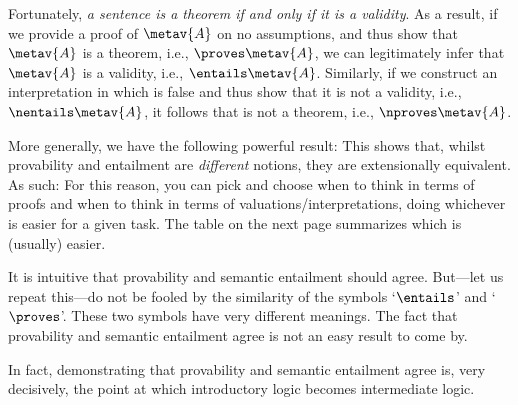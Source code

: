Fortunately, \emph{a sentence is a theorem if and only if it is a validity}. As a result, if we provide a proof of $\metav{A}$ on no assumptions, and thus show that $\metav{A}$ is a theorem, i.e., ${}\proves \metav{A}$, we can legitimately infer that $\metav{A}$ is a validity, i.e., $\entails\metav{A}$. Similarly, if we construct an interpretation in which  is false and thus show that it is not a validity, i.e., $\nentails \metav{A}$, it follows that  is not a theorem, i.e.,  $\nproves \metav{A}$.

More generally, we have the following powerful result:
This shows that, whilst provability and entailment are \emph{different} notions, they are extensionally equivalent. As such:
For this reason, you can pick and choose when to think in terms of proofs and when to think in terms of valuations/interpretations, doing whichever is easier for a given task. The table on the next page summarizes which is (usually) easier.

It is intuitive that provability and semantic entailment should agree. But---let us repeat this---do not be fooled by the similarity of the symbols `$\entails$' and `$\proves$'. These two symbols have very different meanings. The fact that provability and semantic entailment agree is not an easy result to come by.

In fact, demonstrating that provability and semantic entailment agree is, very decisively, the point at which introductory logic becomes intermediate logic.

